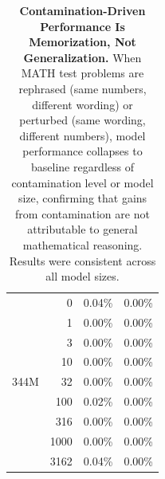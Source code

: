 \begin{table}[t!]
\begin{tabular}{crrr}
        \multirow{9}{*}{344M} 
          & 0    & 0.04\% & 0.00\% \\
          & 1    & 0.00\% & 0.00\% \\
          & 3    & 0.00\% & 0.00\% \\
          & 10   & 0.00\% & 0.00\% \\
          & 32   & 0.00\% & 0.00\% \\
          & 100  & 0.02\% & 0.00\% \\
          & 316  & 0.00\% & 0.00\% \\
          & 1000 & 0.00\% & 0.00\% \\
          & 3162 & 0.04\% & 0.00\% \\
        \bottomrule
    \end{tabular}
    \caption{\textbf{Contamination-Driven Performance Is Memorization, Not Generalization.} When MATH test problems are rephrased (same numbers, different wording) or perturbed (same wording, different numbers), model performance collapses to baseline regardless of contamination level or model size, confirming that gains from contamination are not attributable to general mathematical reasoning. Results were consistent across all model sizes.}
    \label{tab:rephrase_perturb}
\end{table}


